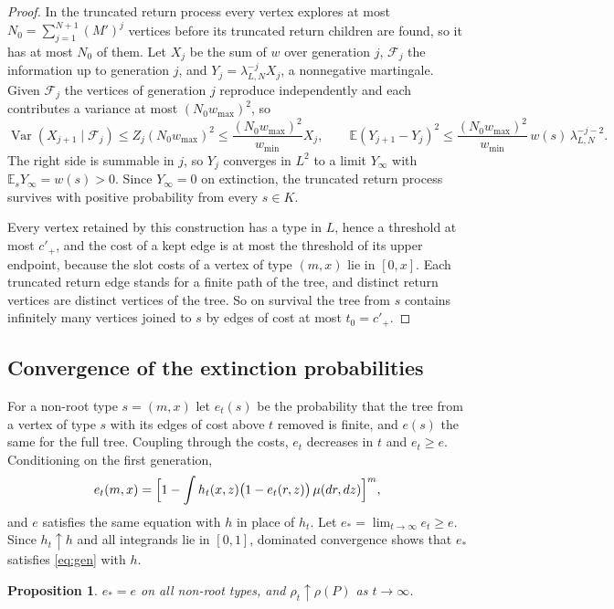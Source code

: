 \documentclass[11pt]{amsart}
\newtheorem{proposition}[theorem]{Proposition}
\theoremstyle{remark}
\numberwithin{equation}{section}
\newcommand{\E}{\mathbb E}
\newcommand{\1}{\mathbf 1}
\begin{document}
\begin{proof}
In the truncated return process every vertex explores at most $N_0=\sum_{j=1}^{N+1}(M')^j$ vertices before its truncated return children are found, so it has at most $N_0$ of them. Let $X_j$ be the sum of $w$ over generation $j$, $\mathcal F_j$ the information up to generation $j$, and $Y_j=\lambda_{L,N}^{-j}X_j$, a nonnegative martingale. Given $\mathcal F_j$ the vertices of generation $j$ reproduce independently and each contributes a variance at most $(N_0w_{\max})^2$, so
\[
\operatorname{Var}(X_{j+1}\mid\mathcal F_j)\le Z_j(N_0w_{\max})^2\le\frac{(N_0w_{\max})^2}{w_{\min}}X_j,
\qquad
\E(Y_{j+1}-Y_j)^2\le\frac{(N_0w_{\max})^2}{w_{\min}}\,w(s)\,\lambda_{L,N}^{-j-2}.
\]
The right side is summable in $j$, so $Y_j$ converges in $L^2$ to a limit $Y_\infty$ with $\E_sY_\infty=w(s)>0$. Since $Y_\infty=0$ on extinction, the truncated return process survives with positive probability from every $s\in K$.

Every vertex retained by this construction has a type in $L$, hence a threshold at most $c'_+$, and the cost of a kept edge is at most the threshold of its upper endpoint, because the slot costs of a vertex of type $(m,x)$ lie in $[0,x]$. Each truncated return edge stands for a finite path of the tree, and distinct return vertices are distinct vertices of the tree. So on survival the tree from $s$ contains infinitely many vertices joined to $s$ by edges of cost at most $t_0=c'_+$.
\end{proof}

\subsection{Convergence of the extinction probabilities}
For a non-root type $s=(m,x)$ let $e_t(s)$ be the probability that the tree from a vertex of type $s$ with its edges of cost above $t$ removed is finite, and $e(s)$ the same for the full tree. Coupling through the costs, $e_t$ decreases in $t$ and $e_t\ge e$. Conditioning on the first generation,
\begin{equation}\label{eq:gen}
e_t(m,x)=\Bigl[1-\int h_t(x,z)\bigl(1-e_t(r,z)\bigr)\,\mu(dr,dz)\Bigr]^m,
\end{equation}
and $e$ satisfies the same equation with $h$ in place of $h_t$. Let $e_*=\lim_{t\to\infty}e_t\ge e$. Since $h_t\uparrow h$ and all integrands lie in $[0,1]$, dominated convergence shows that $e_*$ satisfies \eqref{eq:gen} with $h$.

\begin{proposition}\label{prop:cont}
$e_*=e$ on all non-root types, and $\rho_t\uparrow\rho(P)$ as $t\to\infty$.
\end{proposition}
\end{document}

